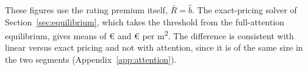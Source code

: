 These figures use the rating premium itself, $\bar R=\hat b$. The exact-pricing solver of Section~\ref{sec:equilibrium}, which takes the threshold from the full-attention equilibrium, gives means of \euro{}\attRbarCoreEurTwoFiftyApt{} and \euro{}\attRbarCoreEurTwoFiftyHouse{} per m\textsuperscript{2}. The difference is consistent with linear versus exact pricing and not with attention, since it is of the same size in the two segments (Appendix~\ref{app:attention}).